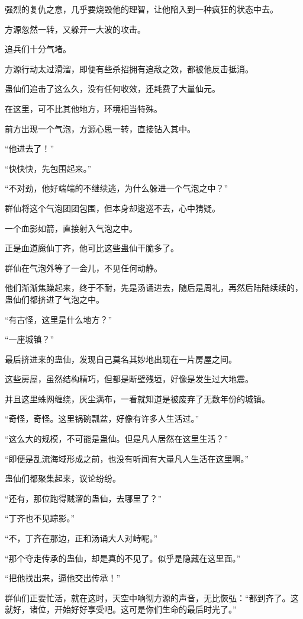 \begin{this_body}
强烈的复仇之意，几乎要烧毁他的理智，让他陷入到一种疯狂的状态中去。

方源忽然一转，又躲开一大波的攻击。

追兵们十分气堵。

方源行动太过滑溜，即便有些杀招拥有追敌之效，都被他反击抵消。

蛊仙们追击了这么久，没有任何收效，还耗费了大量仙元。

在这里，可不比其他地方，环境相当特殊。

前方出现一个气泡，方源心思一转，直接钻入其中。

“他进去了！”

“快快快，先包围起来。”

“不对劲，他好端端的不继续逃，为什么躲进一个气泡之中？”

群仙将这个气泡团团包围，但本身却逡巡不去，心中猜疑。

一个血影如箭，直接射入气泡之中。

正是血道魔仙丁齐，他可比这些蛊仙干脆多了。

群仙在气泡外等了一会儿，不见任何动静。

他们渐渐焦躁起来，终于不耐，先是汤诵进去，随后是周礼，再然后陆陆续续的，蛊仙们都挤进了气泡之中。

“有古怪，这里是什么地方？”

“一座城镇？”

最后挤进来的蛊仙，发现自己莫名其妙地出现在一片房屋之间。

这些房屋，虽然结构精巧，但都是断壁残垣，好像是发生过大地震。

并且这里蛛网缠绕，灰尘满布，一看就知道是被废弃了无数年份的城镇。

“奇怪，奇怪。这里锅碗瓢盆，好像有许多人生活过。”

“这么大的规模，不可能是蛊仙。但是凡人居然在这里生活？”

“即便是乱流海域形成之前，也没有听闻有大量凡人生活在这里啊。”

蛊仙们都聚集起来，议论纷纷。

“还有，那位跑得贼溜的蛊仙，去哪里了？”

“丁齐也不见踪影。”

“不，丁齐在那边，正和汤诵大人对峙呢。”

“那个夺走传承的蛊仙，却是真的不见了。似乎是隐藏在这里面。”

“把他找出来，逼他交出传承！”

群仙们正要忙活，就在这时，天空中响彻方源的声音，无比恢弘：“都到齐了。这就好，诸位，开始好好享受吧。这可是你们生命的最后时光了。”


\end{this_body}
